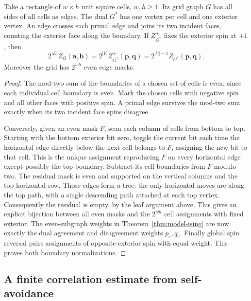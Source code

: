 \begin{theorem}\label{result76}
Take a rectangle of $w\times h$ unit square cells, $w,h\ge1$. Its grid graph $G$ has all sides of all cells as edges. The dual $G^*$ has one vertex per cell and one exterior vertex. An edge crosses each primal edge and joins its two incident faces, counting the exterior face along the boundary. If $Z_{G^*}^{+}$ fixes the exterior spin at $+1$, then
\[
 2^{|E|} Z_G(\mathbf a,\mathbf b)
    =2^{|V|}Z_{G^*}^{+}(\mathbf p,\mathbf q)
    =2^{|V|-1}Z_{G^*}(\mathbf p,\mathbf q).
\]
Moreover the grid has $2^{wh}$ even edge masks.
\end{theorem}
\begin{proof}
The mod-two sum of the boundaries of a chosen set of cells is even, since each individual cell boundary is even. Mark the chosen cells with negative spin and all other faces with positive spin. A primal edge survives the mod-two sum exactly when its two incident face spins disagree.

Conversely, given an even mask $F$, scan each column of cells from bottom to top. Starting with the bottom exterior bit zero, toggle the current bit each time the horizontal edge directly below the next cell belongs to $F$, assigning the new bit to that cell. This is the unique assignment reproducing $F$ on every horizontal edge except possibly the top boundary. Subtract its cell boundaries from $F$ modulo two. The residual mask is even and supported on the vertical columns and the top horizontal row. Those edges form a tree: the only horizontal moves are along the top path, with a single descending path attached at each top vertex. Consequently the residual is empty, by the leaf argument above. This gives an explicit bijection between all even masks and the $2^{wh}$ cell assignments with fixed exterior. The even-subgraph weights in Theorem~\ref{thm:model-ising} are now exactly the dual agreement and disagreement weights $p_e,q_e$. Finally global spin reversal pairs assignments of opposite exterior spin with equal weight. This proves both boundary normalizations.
\end{proof}

\subsection{A finite correlation estimate from self-avoidance}

